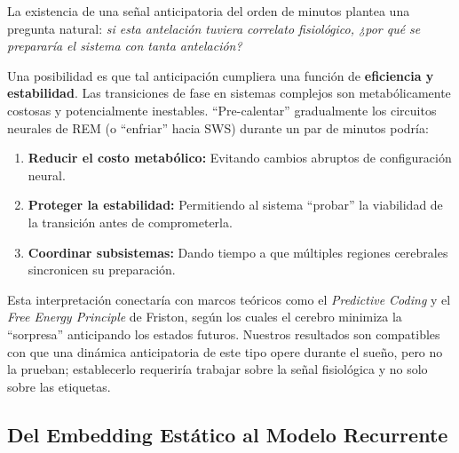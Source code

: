 La existencia de una señal anticipatoria del orden de minutos plantea una pregunta natural: \textit{si esta antelación tuviera correlato fisiológico, ¿por qué se prepararía el sistema con tanta antelación?}

Una posibilidad es que tal anticipación cumpliera una función de \textbf{eficiencia y estabilidad}. Las transiciones de fase en sistemas complejos son metabólicamente costosas y potencialmente inestables. ``Pre-calentar'' gradualmente los circuitos neurales de REM (o ``enfriar'' hacia SWS) durante un par de minutos podría:

\begin{enumerate}
    \item \textbf{Reducir el costo metabólico:} Evitando cambios abruptos de configuración neural.
    \item \textbf{Proteger la estabilidad:} Permitiendo al sistema ``probar'' la viabilidad de la transición antes de comprometerla.
    \item \textbf{Coordinar subsistemas:} Dando tiempo a que múltiples regiones cerebrales sincronicen su preparación.
\end{enumerate}

Esta interpretación conectaría con marcos teóricos como el \textit{Predictive Coding} y el \textit{Free Energy Principle} de Friston, según los cuales el cerebro minimiza la ``sorpresa'' anticipando los estados futuros. Nuestros resultados son compatibles con que una dinámica anticipatoria de este tipo opere durante el sueño, pero no la prueban; establecerlo requeriría trabajar sobre la señal fisiológica y no solo sobre las etiquetas.

\subsection{Del Embedding Estático al Modelo Recurrente}

